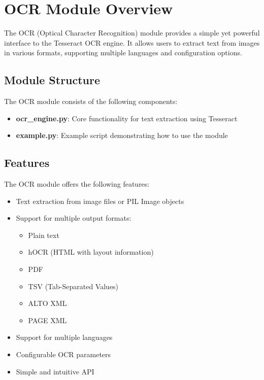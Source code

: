\section{OCR Module Overview}

The OCR (Optical Character Recognition) module provides a simple yet powerful interface to the Tesseract OCR engine. It allows users to extract text from images in various formats, supporting multiple languages and configuration options.

\subsection{Module Structure}

The OCR module consists of the following components:

\begin{itemize}
  \item \textbf{ocr\_engine.py}: Core functionality for text extraction using Tesseract
  \item \textbf{example.py}: Example script demonstrating how to use the module
\end{itemize}

\subsection{Features}

The OCR module offers the following features:

\begin{itemize}
  \item Text extraction from image files or PIL Image objects
  \item Support for multiple output formats:
    \begin{itemize}
      \item Plain text
      \item hOCR (HTML with layout information)
      \item PDF
      \item TSV (Tab-Separated Values)
      \item ALTO XML
      \item PAGE XML
    \end{itemize}
  \item Support for multiple languages
  \item Configurable OCR parameters
  \item Simple and intuitive API
\end{itemize}


